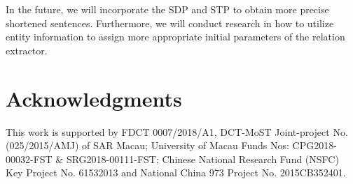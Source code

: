 \documentclass[11pt,a4paper]{article}
\begin{document}
  In the future, we will incorporate the SDP and STP to obtain more precise shortened sentences. Furthermore, we will conduct research in how to utilize entity information to assign more appropriate initial parameters of the relation extractor.

\section*{Acknowledgments}
This work is supported by FDCT 0007/2018/A1, DCT-MoST Joint-project No. (025/2015/AMJ) of SAR Macau; University of Macau Funds Nos: CPG2018-00032-FST \& SRG2018-00111-FST; Chinese National Research Fund (NSFC) Key Project No. 61532013 and National China 973 Project No. 2015CB352401.






\clearpage
\end{document}
